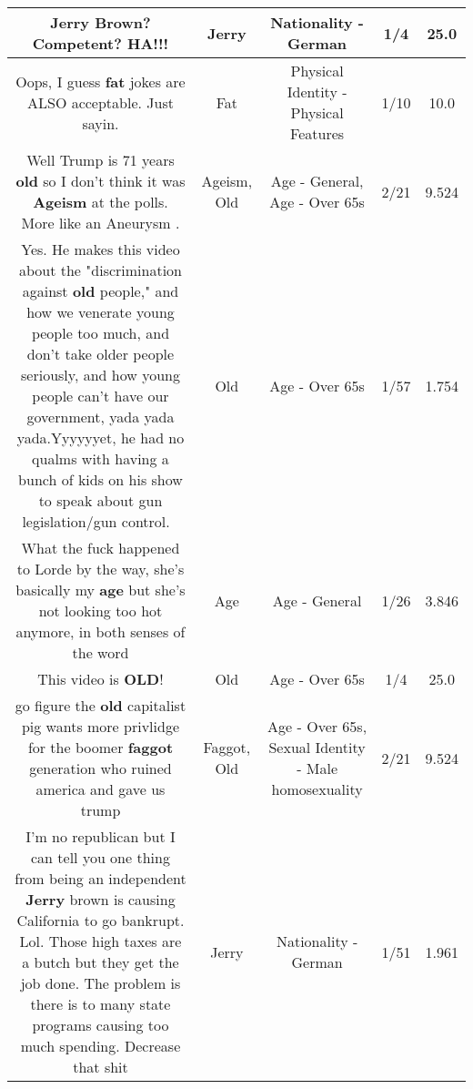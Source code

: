 \documentclass[11pt]{article}
\newlength\mylength
\begin{document}
\begin{center}
\begin{longtable}{|C{.65\mylength}|C{.30\mylength}|C{.12\mylength}|C{.12\mylength}|C{.12\mylength}|}
  \small Jerry Brown? Competent? HA!!!\normalsize   & Jerry & Nationality - German & 1/4 & 25.0 \\  \hline
  \small Oops, I guess \textbf{fat} jokes are ALSO acceptable.  Just sayin.\normalsize   & Fat & Physical Identity - Physical Features & 1/10 & 10.0 \\  \hline
  \small Well Trump is 71 years \textbf{old} so I don't think it was \textbf{Ageism} at the polls.   More like an Aneurysm .\normalsize   & Ageism, Old & Age - General, Age - Over 65s & 2/21 & 9.524 \\  \hline
  \small Yes. He makes this video about the "discrimination against \textbf{old} people," and how we venerate young people too much, and don't take older people seriously, and how young people can't have our government, yada yada yada.Yyyyyyet, he had no qualms with having a bunch of kids on his show to speak about gun legislation/gun control. 🤔\normalsize   & Old & Age - Over 65s & 1/57 & 1.754 \\  \hline
  \small What the fuck happened to Lorde by the way, she's basically my \textbf{age} but she's not looking too hot anymore, in both senses of the word\normalsize   & Age & Age - General & 1/26 & 3.846 \\  \hline
  \small This video is \textbf{OLD}!\normalsize   & Old & Age - Over 65s & 1/4 & 25.0 \\  \hline
  \small go figure the \textbf{old} capitalist pig wants more privlidge for the boomer \textbf{faggot} generation who ruined america and gave us trump\normalsize   & Faggot, Old & Age - Over 65s, Sexual Identity - Male homosexuality & 2/21 & 9.524 \\  \hline
  \small I'm no republican but I can tell you one thing from being an independent \textbf{Jerry} brown is causing California to go bankrupt. Lol. Those high taxes are a butch but they get the job done. The problem is there is to many state programs causing too much spending. Decrease that shit\normalsize   & Jerry & Nationality - German & 1/51 & 1.961 \\  \hline

\end{longtable}
\end{center}
\end{document}
